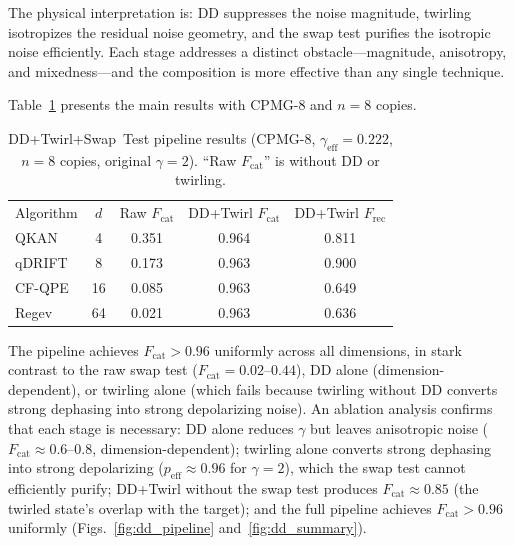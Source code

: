 \documentclass[prx,twocolumn,superscriptaddress,longbibliography,floatfix]{revtex4-2}
\begin{document}
The physical interpretation is: DD suppresses the noise magnitude, twirling isotropizes the residual noise geometry, and the swap test purifies the isotropic noise efficiently.
Each stage addresses a distinct obstacle---magnitude, anisotropy, and mixedness---and the composition is more effective than any single technique.

Table~\ref{tab:dd_pipeline} presents the main results with CPMG-8 and $n = 8$ copies.

\begin{table}[tb]
\caption{DD+Twirl+Swap~Test pipeline results (CPMG-8, $\gamma_\mathrm{eff} = 0.222$, $n = 8$ copies, original $\gamma = 2$). ``Raw $F_\mathrm{cat}$'' is without DD or twirling.}
\label{tab:dd_pipeline}
\begin{ruledtabular}
\begin{tabular}{lcccc}
Algorithm & $d$ & Raw $F_\mathrm{cat}$ & \makecell{DD+Twirl \\ $F_\mathrm{cat}$} & \makecell{DD+Twirl \\ $F_\mathrm{rec}$} \\
\colrule
QKAN & 4 & 0.351 & 0.964 & 0.811 \\
qDRIFT & 8 & 0.173 & 0.963 & 0.900 \\
CF-QPE & 16 & 0.085 & 0.963 & 0.649 \\
Regev & 64 & 0.021 & 0.963 & 0.636 \\
\end{tabular}
\end{ruledtabular}
\end{table}

The pipeline achieves $F_\mathrm{cat} > 0.96$ uniformly across all dimensions, in stark contrast to the raw swap test ($F_\mathrm{cat} = 0.02$--$0.44$), DD alone (dimension-dependent), or twirling alone (which fails because twirling without DD converts strong dephasing into strong depolarizing noise).
An ablation analysis confirms that each stage is necessary:
DD alone reduces $\gamma$ but leaves anisotropic noise ($F_\mathrm{cat} \approx 0.6$--$0.8$, dimension-dependent);
twirling alone converts strong dephasing into strong depolarizing ($p_\mathrm{eff} \approx 0.96$ for $\gamma = 2$), which the swap test cannot efficiently purify;
DD+Twirl without the swap test produces $F_\mathrm{cat} \approx 0.85$ (the twirled state's overlap with the target);
and the full pipeline achieves $F_\mathrm{cat} > 0.96$ uniformly (Figs.~\ref{fig:dd_pipeline} and~\ref{fig:dd_summary}).
\end{document}
